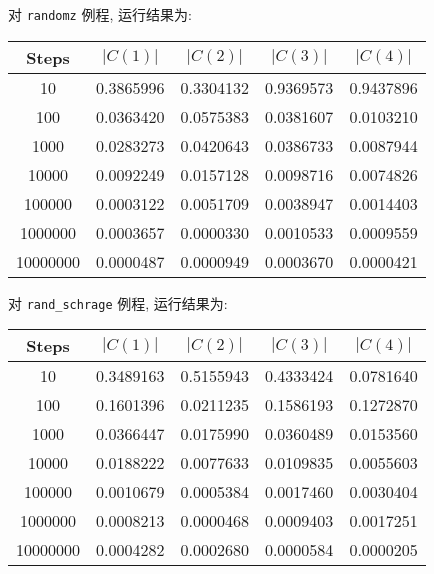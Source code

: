 对 \verb|randomz| 例程, 运行结果为:
\begin{center}
\begin{tabular}{c|c|c|c|c}\hline
Steps&$|C(1)|$&$|C(2)|$&$|C(3)|$&$|C(4)|$\\\hline
10& 0.3865996& 0.3304132& 0.9369573& 0.9437896\\\hline
100& 0.0363420& 0.0575383& 0.0381607& 0.0103210\\\hline
1000& 0.0283273& 0.0420643& 0.0386733& 0.0087944\\\hline
10000& 0.0092249& 0.0157128& 0.0098716& 0.0074826\\\hline
100000& 0.0003122& 0.0051709& 0.0038947& 0.0014403\\\hline
1000000& 0.0003657& 0.0000330& 0.0010533& 0.0009559\\\hline
10000000& 0.0000487& 0.0000949& 0.0003670& 0.0000421\\\hline
\end{tabular}
\end{center}
对 \verb|rand_schrage| 例程, 运行结果为:
\begin{center}
\begin{tabular}{c|c|c|c|c}\hline
Steps&$|C(1)|$&$|C(2)|$&$|C(3)|$&$|C(4)|$\\\hline
10& 0.3489163& 0.5155943& 0.4333424& 0.0781640\\\hline
100& 0.1601396& 0.0211235& 0.1586193& 0.1272870\\\hline
1000& 0.0366447& 0.0175990& 0.0360489& 0.0153560\\\hline
10000& 0.0188222& 0.0077633& 0.0109835& 0.0055603\\\hline
100000& 0.0010679& 0.0005384& 0.0017460& 0.0030404\\\hline
1000000& 0.0008213& 0.0000468& 0.0009403& 0.0017251\\\hline
10000000& 0.0004282& 0.0002680& 0.0000584& 0.0000205\\\hline
\end{tabular}
\end{center}
